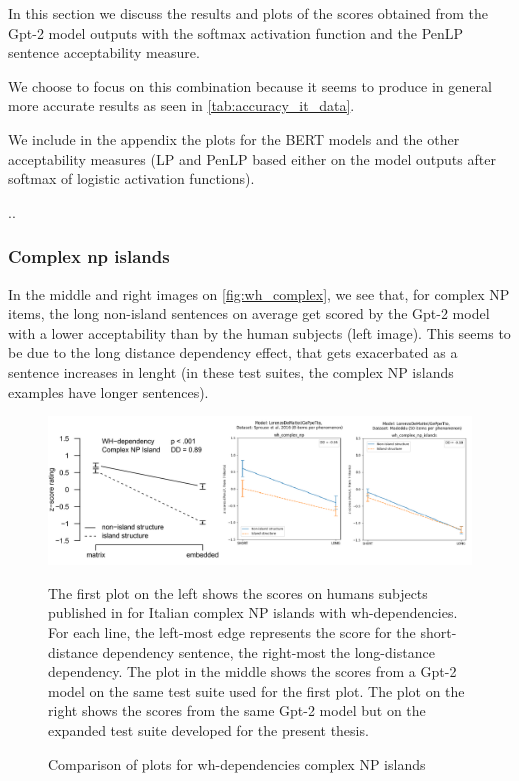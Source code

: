 In this section we discuss the results and plots of the scores obtained from the Gpt-2 model outputs with the softmax activation function and the PenLP sentence acceptability measure. 

We choose to focus on this combination because it seems to produce in general more accurate results as seen in \autoref{tab:accuracy_it_data}. 

We include in the appendix the plots for the BERT models and the other acceptability measures (LP and PenLP based either on the model outputs after softmax of logistic activation functions).

..


\subsubsection{Complex np islands}

In the middle and right images on \autoref{fig:wh_complex}, we see that, for complex NP items, the long non-island sentences on average get scored by the Gpt-2 model with a lower acceptability than by the human subjects (left image). This seems to be due to the long distance dependency effect, that gets exacerbated as a sentence increases in lenght (in these test suites, the complex NP islands examples have longer sentences).

\begin{figure}[H]
	\centering
	\includegraphics[width=1\textwidth]{images/Chapter1/combined_wh-complex.png} 
	\caption{Comparison of plots for wh-dependencies complex NP islands} 
	\label{fig:wh_complex} %
	\medskip
	\small
	The first plot on the left shows the scores on humans subjects published in \citet{sprouse2016experimental} for Italian complex NP islands with wh-dependencies. For each line, the left-most edge represents the score for the short-distance dependency sentence, the right-most the long-distance dependency. The plot in the middle shows the scores from a Gpt-2 model \citep{de2020geppetto} on the same test suite used for the first plot. The plot on the right shows the scores from the same Gpt-2 model but on the expanded test suite developed for the present thesis.
\end{figure}


